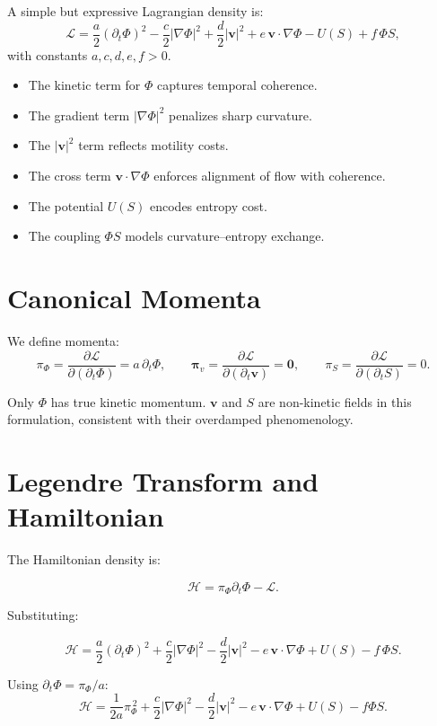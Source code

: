 \documentclass[12pt]{article}
\begin{document}
A simple but expressive Lagrangian density is:
\[
\mathcal{L}
=
\frac{a}{2} (\partial_t \Phi)^2
- \frac{c}{2} |\nabla \Phi|^2
+ \frac{d}{2} |\mathbf{v}|^2
+ e\, \mathbf{v}\cdot\nabla\Phi
- U(S)
+ f\, \Phi S,
\]
with constants $a, c, d, e, f > 0$.

\begin{itemize}
    \item The kinetic term for $\Phi$ captures temporal coherence.
    \item The gradient term $|\nabla\Phi|^2$ penalizes sharp curvature.
    \item The $|\mathbf{v}|^2$ term reflects motility costs.
    \item The cross term $\mathbf{v}\cdot\nabla\Phi$ enforces alignment of
    flow with coherence.
    \item The potential $U(S)$ encodes entropy cost.
    \item The coupling $\Phi S$ models curvature--entropy exchange.
\end{itemize}

\section{Canonical Momenta}

We define momenta:
\[
\pi_\Phi = \frac{\partial \mathcal{L}}{\partial(\partial_t \Phi)} = a\,\partial_t \Phi,
\qquad
\bm{\pi}_{\!v}
= \frac{\partial \mathcal{L}}{\partial(\partial_t \mathbf{v})} = \mathbf{0},
\qquad
\pi_S = \frac{\partial \mathcal{L}}{\partial(\partial_t S)} = 0.
\]

Only $\Phi$ has true kinetic momentum.  
$\mathbf{v}$ and $S$ are non-kinetic fields in this formulation, consistent with
their overdamped phenomenology.

\section{Legendre Transform and Hamiltonian}

The Hamiltonian density is:

\[
\mathcal{H}
= \pi_\Phi \partial_t \Phi - \mathcal{L}.
\]

Substituting:

\[
\mathcal{H}
=
\frac{a}{2} (\partial_t \Phi)^2
+ \frac{c}{2} |\nabla\Phi|^2
- \frac{d}{2}|\mathbf{v}|^2
- e\, \mathbf{v} \cdot \nabla\Phi
+ U(S)
- f\, \Phi S.
\]

Using $\partial_t\Phi = \pi_\Phi/a$:
\[
\boxed{
\mathcal{H}
=
\frac{1}{2a} \pi_\Phi^{\,2}
+ \frac{c}{2} |\nabla\Phi|^2
- \frac{d}{2} |\mathbf{v}|^2
- e\, \mathbf{v}\cdot\nabla\Phi
+ U(S) - f\Phi S.
}
\]
\end{document}
